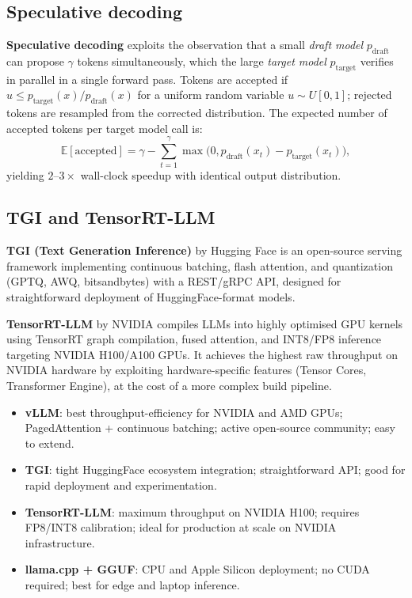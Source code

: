\documentclass[11pt,a4paper]{article}
\begin{document}
	\subsection{Speculative decoding}

	\textbf{Speculative decoding} exploits the observation that a small \emph{draft model} $p_{\text{draft}}$ can propose $\gamma$ tokens simultaneously, which the large \emph{target model} $p_{\text{target}}$ verifies in parallel in a single forward pass. Tokens are accepted if $u \le p_{\text{target}}(x)/p_{\text{draft}}(x)$ for a uniform random variable $u \sim U[0,1]$; rejected tokens are resampled from the corrected distribution. The expected number of accepted tokens per target model call is:
	\begin{equation}
		\mathbb{E}[\text{accepted}] = \gamma - \sum_{t=1}^{\gamma} \max\!\bigl(0, p_{\text{draft}}(x_t) - p_{\text{target}}(x_t)\bigr),
	\end{equation}
	yielding $2$--$3\times$ wall-clock speedup with identical output distribution.

	\subsection{TGI and TensorRT-LLM}

	\textbf{TGI (Text Generation Inference)} by Hugging Face is an open-source serving framework implementing continuous batching, flash attention, and quantization (GPTQ, AWQ, bitsandbytes) with a REST/gRPC API, designed for straightforward deployment of HuggingFace-format models.

	\textbf{TensorRT-LLM} by NVIDIA compiles LLMs into highly optimised GPU kernels using TensorRT graph compilation, fused attention, and INT8/FP8 inference targeting NVIDIA H100/A100 GPUs. It achieves the highest raw throughput on NVIDIA hardware by exploiting hardware-specific features (Tensor Cores, Transformer Engine), at the cost of a more complex build pipeline.

	\begin{keyconcept}
		\begin{itemize}[nosep]
			\item \textbf{vLLM}: best throughput-efficiency for NVIDIA and AMD GPUs; PagedAttention + continuous batching; active open-source community; easy to extend.
			\item \textbf{TGI}: tight HuggingFace ecosystem integration; straightforward API; good for rapid deployment and experimentation.
			\item \textbf{TensorRT-LLM}: maximum throughput on NVIDIA H100; requires FP8/INT8 calibration; ideal for production at scale on NVIDIA infrastructure.
			\item \textbf{llama.cpp + GGUF}: CPU and Apple Silicon deployment; no CUDA required; best for edge and laptop inference.
		\end{itemize}
	\end{keyconcept}
\end{document}
